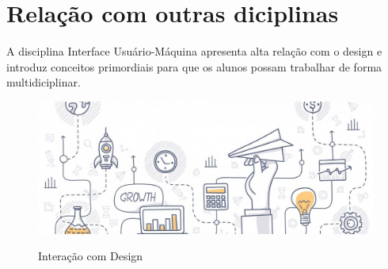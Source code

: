 \documentclass{article}
\begin{document}
\section{Relação com outras diciplinas}
A disciplina Interface Usuário-Máquina apresenta alta relação com o design e introduz conceitos primordiais para que os alunos possam trabalhar de forma multidiciplinar.


\begin{figure}[h!]
\centering
\includegraphics[scale=0.2]{design.jpg}
\caption{Interação com Design}
\cite{design}
\label{fig:design}
\end{figure}



\end{document}
